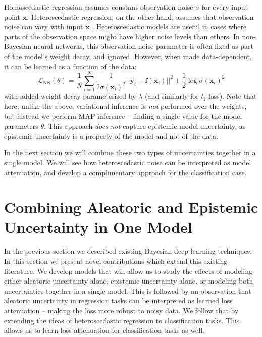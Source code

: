 \documentclass{article}
\newcommand{\cL}{\mathcal{L}}
\newcommand{\f}{\mathbf{f}}
\newcommand{\x}{\mathbf{x}}
\newcommand{\y}{\mathbf{y}}
\begin{document}
Homoscedastic regression assumes constant observation noise $\sigma$ for every input point $\x$. Heteroscedastic regression, on the other hand, assumes that observation noise can vary with input $\x$ \citep{nix1994estimating, le2005heteroscedastic}. Heteroscedastic models are useful in cases where parts of the observation space might have higher noise levels than others.
In non-Bayesian neural networks, this observation noise parameter is often fixed as part of the model's weight decay, and ignored. However, when made data-dependent, it can be learned as a function of the data:
\begin{equation}
\cL_\text{NN}(\theta) = \frac{1}{N} \sum_{i=1}^N \frac{1}{2\sigma(\x_i)^2} ||\y_i - \f(\x_i)||^2 + \frac{1}{2} \log \sigma(\x_i)^2 \end{equation}
with added weight decay parameterised by $\lambda$ (and similarly for $l_1$ loss).
Note that here, unlike the above, variational inference is \textit{not} performed over the weights, but instead we perform MAP inference -- finding a single value for the model parameters $\theta$. This approach \textit{does not} capture epistemic model uncertainty, as epistemic uncertainty is a property of the model and not of the data.

In the next section we will combine these two types of uncertainties together in a single model. We will see how heteroscedastic noise can be interpreted as model attenuation, and develop a complimentary approach for the classification case. 


\section{Combining Aleatoric and Epistemic Uncertainty in One Model}
\label{sec:method}

In the previous section we described existing Bayesian deep learning techniques. In this section we present novel contributions which extend this existing literature. We develop models that will allow us to study the effects of modeling either aleatoric uncertainty alone, epistemic uncertainty alone, or modeling both uncertainties together in a single model. This is followed by an observation that aleatoric uncertainty in regression tasks can be interpreted as learned loss attenuation -- making the loss more robust to noisy data. We follow that by extending the ideas of heteroscedastic regression to classification tasks. This allows us to learn loss attenuation for classification tasks as well. 
\end{document}
